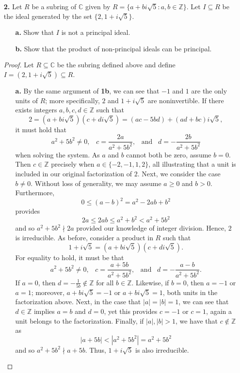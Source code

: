 \documentclass[ 12pt ]{article}
\begin{document}
\begin{enumerate}
	\item[\textbf{2.}] Let $R$ be a subring of $\mathbb{C}$ given by $R = \{ a + bi \sqrt{5} : a, b \in \mathbb{Z} \}$. Let $I \subseteq R$ be the ideal generated by the set $\{ 2, 1 + i\sqrt{5} \}$.
	\begin{enumerate}
		\item[\textbf{a.}] Show that $I$ is not a principal ideal.
		\item[\textbf{b.}] Show that the product of non-principal ideals can be principal.
	\end{enumerate}

		\begin{proof}
			Let $R \subseteq \mathbb{C}$ be the subring defined above and define $I = (2, 1 + i\sqrt{5}) \subseteq R$.
			\begin{enumerate}
				\item[\textbf{a.}] By the same argument of \textbf{1b}, we can see that $-1$ and $1$ are the only units of $R$; more specifically, $2$ and $1 + i\sqrt{5}$ are noninvertible. If there exists integers $a, b, c, d \in \mathbb{Z}$ such that $$2 = (a + bi\sqrt{5})(c + di\sqrt{5}) = (ac - 5bd) + (ad + bc)i\sqrt{5},$$ it must hold that $$a^2 + 5b^2 \neq 0,\;\;\; c = \frac{2a}{a^2 + 5b^2},\;\;\; \mathrm{and}\;\;\; d = -\frac{2b}{a^2 + 5b^2}$$ when solving the system. As $a$ and $b$ cannot both be zero, assume $b = 0$. Then $c \in \mathbb{Z}$ precisely when $a \in \{ -2, -1, 1, 2 \}$, all illustrating that a unit is included in our original factorization of $2$. Next, we consider the case $b \neq 0$. Without loss of generality, we may assume $a \geq 0$ and $b > 0$. Furthermore, $$0 \leq (a - b)^2 = a^2 - 2ab + b^2$$ provides $$2a \leq 2ab \leq a^2 + b^2 < a^2 + 5b^2$$ and so $a^2 + 5b^2 \nmid 2a$ provided our knowledge of integer division. Hence, $2$ is irreducible. As before, consider a product in $R$ such that $$1 + i\sqrt{5} = (a + bi\sqrt{5})(c + di\sqrt{5}).$$ For equality to hold, it must be that $$a^2 + 5b^2 \neq 0,\;\;\; c = \frac{a + 5b}{a^2 + 5b^2},\;\;\; \mathrm{and}\;\;\; d = -\frac{a - b}{a^2 + 5b^2}.$$ If $a = 0$, then $d = -\frac{1}{5b} \notin \mathbb{Z}$ for all $b \in \mathbb{Z}$. Likewise, if $b = 0$, then $a = -1$ or $a = 1$; moreover, $a + bi\sqrt{5} = -1$ or $a + bi\sqrt{5} = 1$, both units in the factorization above. Next, in the case that $|a| = |b| = 1$, we can see that $d \in \mathbb{Z}$ implies $a = b$ and $d = 0$, yet this provides $c = -1$ or $c = 1$, again a unit belongs to the factorization. Finally, if $|a|, |b| > 1$, we have that $c \notin \mathbb{Z}$ as $$|a + 5b| < |a^2 + 5b^2| = a^2 + 5b^2$$ and so $a^2 + 5b^2 \nmid a + 5b$. Thus, $1 + i\sqrt{5}$ is also irreducible. \\


\end{enumerate}
\end{proof}
\end{enumerate}
\end{document}
